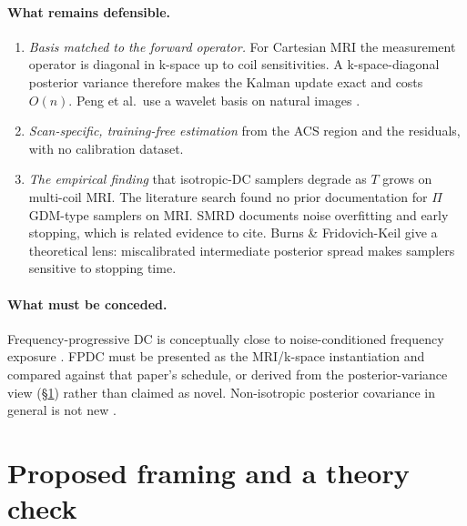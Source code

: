 \documentclass[10pt,a4paper]{article}
\newcommand{\pigdm}{$\Pi$GDM}
\begin{document}
\paragraph{What remains defensible.}
\begin{enumerate}[label=(\roman*)]
  \item \emph{Basis matched to the forward operator.} For Cartesian MRI the measurement
        operator is diagonal in k-space up to coil sensitivities. A k-space-diagonal
        posterior variance therefore makes the Kalman update exact and costs $O(n)$.
        Peng et al.\ use a wavelet basis on natural images \cite{peng2024optimal}.
  \item \emph{Scan-specific, training-free estimation} from the ACS region and the
        residuals, with no calibration dataset.
  \item \emph{The empirical finding} that isotropic-DC samplers degrade as $T$ grows on
        multi-coil MRI. The literature search found no prior documentation for \pigdm-type
        samplers on MRI. SMRD \cite{ozturkler2023smrd} documents noise overfitting and
        early stopping, which is related evidence to cite. Burns \& Fridovich-Keil
        \cite{burns2026finite} give a theoretical lens: miscalibrated intermediate
        posterior spread makes samplers sensitive to stopping time.
\end{enumerate}

\paragraph{What must be conceded.} Frequency-progressive DC is conceptually close to
noise-conditioned frequency exposure \cite{tian2026frequency}. FPDC must be presented as
the MRI/k-space instantiation and compared against that paper's schedule, or derived
from the posterior-variance view (\S\ref{sec:theory}) rather than claimed as novel.
Non-isotropic posterior covariance in general is not new \cite{peng2024optimal,boys2024tmpd,rozet2024mmps}.

\section{Proposed framing and a theory check}
\label{sec:theory}
\end{document}
